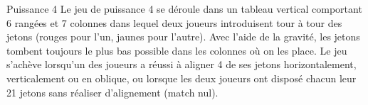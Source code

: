 	


\begin{Exercice}{Puissance 4}
	Le jeu de puissance 4 se déroule dans un tableau vertical comportant 6
	rangées et 7 colonnes dans lequel deux joueurs introduisent tour à tour
	des jetons (rouges pour l’un, jaunes pour l’autre). Avec l’aide de la
	gravité, les jetons tombent toujours le plus bas possible dans les
	colonnes où on les place. Le jeu s’achève lorsqu’un des joueurs a
	réussi à aligner 4 de ses jetons horizontalement, verticalement ou en
	oblique, ou lorsque les deux joueurs ont disposé chacun leur 21 jetons
	sans réaliser d’alignement (match nul).


	

\end{Exercice}
